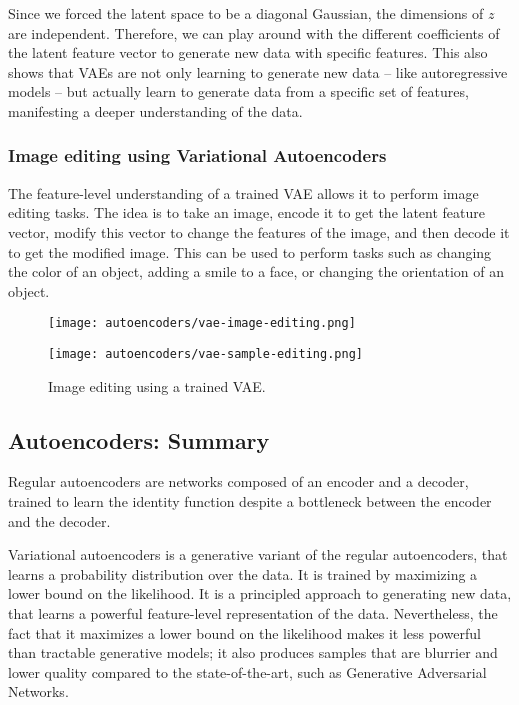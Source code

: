 Since we forced the latent space to be a diagonal Gaussian, the dimensions of $z$ are independent. Therefore, we can play around with the different coefficients of the latent feature vector to generate new data with specific features. This also shows that VAEs are not only learning to generate new data -- like autoregressive models -- but actually learn to generate data from a specific set of features, manifesting a deeper understanding of the data.

\subsubsection{Image editing using Variational Autoencoders}
The feature-level understanding of a trained VAE allows it to perform image editing tasks. The idea is to take an image, encode it to get the latent feature vector, modify this vector to change the features of the image, and then decode it to get the modified image. This can be used to perform tasks such as changing the color of an object, adding a smile to a face, or changing the orientation of an object.
\begin{figure}[H]
    \centering
    \texttt{[image: autoencoders/vae-image-editing.png]}
\end{figure}

\begin{figure}[H]
    \centering
    \texttt{[image: autoencoders/vae-sample-editing.png]}
    \caption{Image editing using a trained VAE.}
\end{figure}

\subsection*{Autoencoders: Summary}
Regular autoencoders are networks composed of an encoder and a decoder, trained to learn the identity function despite a bottleneck between the encoder and the decoder.

Variational autoencoders is a generative variant of the regular autoencoders, that learns a probability distribution over the data. It is trained by maximizing a lower bound on the likelihood. It is a principled approach to generating new data, that learns a powerful feature-level representation of the data. Nevertheless, the fact that it maximizes a lower bound on the likelihood makes it less powerful than tractable generative models; it also produces samples that are blurrier and lower quality compared to the state-of-the-art, such as Generative Adversarial Networks.

\newpage